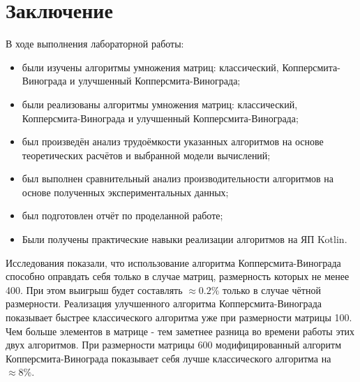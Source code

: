 \documentclass[12pt]{report}
\begin{document}
\chapter*{Заключение}
В ходе выполнения лабораторной работы:
\begin{itemize}
\item были изучены алгоритмы умножения матриц: классический, Копперсмита-Винограда и улучшенный Копперсмита-Винограда;
\item были реализованы алгоритмы умножения матриц: классический, Копперсмита-Винограда и улучшенный Копперсмита-Винограда;
\item был произведён анализ трудоёмкости указанных алгоритмов на основе теоретических расчётов и выбранной модели вычислений;
\item был выполнен сравнительный анализ производительности алгоритмов на основе полученных экспериментальных данных;
\item был подготовлен отчёт по проделанной работе;
\item Были получены практические навыки реализации алгоритмов на ЯП Kotlin.
\end{itemize}

Исследования показали, что использование алгоритма Копперсмита-Винограда способно оправдать себя только в случае матриц, размерность которых не менее 400. При этом выигрыш будет составлять $\approx0.2\%$ только в случае чётной размерности. Реализация улучшенного алгоритма Копперсмита-Винограда показывает быстрее классического алгоритма уже при размерности матрицы 100. Чем больше элементов в матрице - тем заметнее разница во времени работы этих двух алгоритмов. При размерности матрицы 600 модифицированный алгоритм Копперсмита-Винограда показывает себя лучше классического алгоритма на $\approx8\%$.

\end{document}
